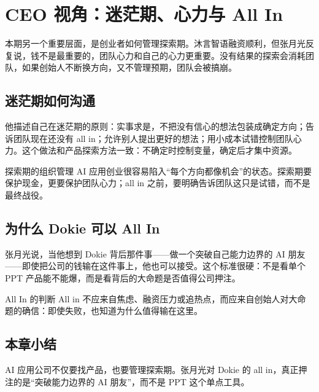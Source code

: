 \section{CEO 视角：迷茫期、心力与 All In}

本期另一个重要层面，是创业者如何管理探索期。沐言智语融资顺利，但张月光反复说，钱不是最重要的，团队心力和自己的心力更重要。没有结果的探索会消耗团队，如果创始人不断换方向，又不管理预期，团队会被搞崩。

\subsection{迷茫期如何沟通}

他描述自己在迷茫期的原则：实事求是，不把没有信心的想法包装成确定方向；告诉团队现在还没有 all in；允许别人提出更好的想法；用小成本试错控制团队心力。这个做法和产品探索方法一致：不确定时控制变量，确定后才集中资源。

\begin{knowledgebox}{探索期的组织管理}
AI 应用创业很容易陷入“每个方向都像机会”的状态。探索期要保护现金，更要保护团队心力；all in 之前，要明确告诉团队这只是试错，而不是最终战役。
\end{knowledgebox}

\subsection{为什么 Dokie 可以 All In}

张月光说，当他想到 Dokie 背后那件事——做一个突破自己能力边界的 AI 朋友——即使把公司的钱输在这件事上，他也可以接受。这个标准很硬：不是看单个 PPT 产品能不能爆，而是看背后的大命题是否值得公司押注。

\begin{importantbox}{All In 的判断}
All in 不应来自焦虑、融资压力或追热点，而应来自创始人对大命题的确信：即使失败，也知道为什么值得输在这里。
\end{importantbox}

\subsection{本章小结}

AI 应用公司不仅要找产品，也要管理探索期。张月光对 Dokie 的 all in，真正押注的是“突破能力边界的 AI 朋友”，而不是 PPT 这个单点工具。

